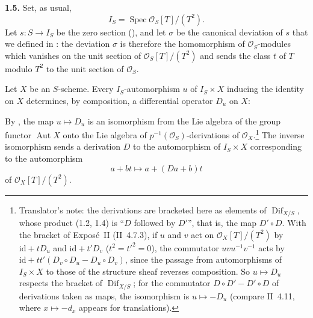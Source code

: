\medskip
\noindent\textbf{1.5.}
\label{sga3:VIIA:1.5}
Set, as usual,
\[
  I_S=\operatorname{Spec}\mathcal O_S[T]/(T^2).
\]
Let \(s:S\to I_S\) be the zero section (), and let \(\sigma\) be the
canonical deviation of \(s\) that we defined in : the deviation \(\sigma\) is
therefore the homomorphism of \(\mathcal O_S\)-modules which vanishes on the unit section
of \(\mathcal O_S[T]/(T^2)\) and sends the class \(t\) of \(T\) modulo
\(T^2\) to the unit section of \(\mathcal O_S\).

Let \(X\) be an \(S\)-scheme. Every \(I_S\)-automorphism \(u\) of
\(I_S\times X\) inducing the identity on \(X\) determines, by
composition, a differential operator \(D_u\) on \(X\):
\begin{center}
  \label{sga3:VIIA:1.5-infinitesimal-automorphism-sequence}
  
\end{center}
By , the map \(u\mapsto D_u\) is an isomorphism from the
Lie algebra of the group functor \(\operatorname{Aut}X\) onto the Lie
algebra of \(p^{-1}(\mathcal O_S)\)-derivations of \(\mathcal O_X\).\footnote{Translator's
note: the derivations are bracketed here as elements of
\(\operatorname{Dif}_{X/S}\), whose product (1.2, 1.4) is ``\(D\)
followed by \(D'\)'', that is, the map \(D'\circ D\). With the bracket of
Expos\'e~II (II~4.7.3), if \(u\) and \(v\) act on
\(\mathcal O_X[T]/(T^2)\) by \(\mathrm{id}+tD_u\) and
\(\mathrm{id}+t'D_v\) (\(t^2=t'^2=0\)), the commutator \(uvu^{-1}v^{-1}\)
acts by \(\mathrm{id}+tt'(D_v\circ D_u-D_u\circ D_v)\), since the passage
from automorphisms of \(I_S\times X\) to those of the structure sheaf
reverses composition. So \(u\mapsto D_u\) respects the bracket of
\(\operatorname{Dif}_{X/S}\); for the commutator \(D\circ D'-D'\circ D\)
of derivations taken as maps, the isomorphism is \(u\mapsto-D_u\)
(compare II~4.11, where \(x\mapsto-d_x\) appears for translations).} The
inverse isomorphism sends a derivation \(D\) to the automorphism of
\(I_S\times X\) corresponding to the automorphism
\[
  a+bt\longmapsto a+(Da+b)t
\]
of \(\mathcal O_X[T]/(T^2)\).

